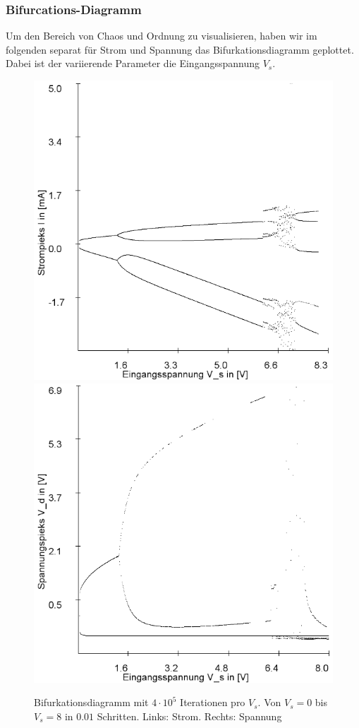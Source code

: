 \documentclass{scrartcl}
\begin{document}
\subsubsection{Bifurcations-Diagramm}
Um den Bereich von Chaos und Ordnung zu visualisieren, haben wir im folgenden separat für Strom und Spannung das Bifurkationsdiagramm geplottet. Dabei ist der variierende Parameter die Eingangsspannung $V_s$.
\begin{figure}[!htbp]
\includegraphics[scale=0.4]{schwing-bifurc-von-0-8-in-0,01schritten-400k-strom}
\includegraphics[scale=0.4]{schwing-bifurc-von-0-8-in-0,01schritten-400k-spannung}
\caption{Bifurkationsdiagramm mit $4\cdot10^5$ Iterationen pro $V_s$. Von $V_s=0$ bis $V_s=8$ in $0.01$ Schritten. Links: Strom. Rechts: Spannung}
\label{fig:ldr-bifurc}
\end{figure}
\end{document}
